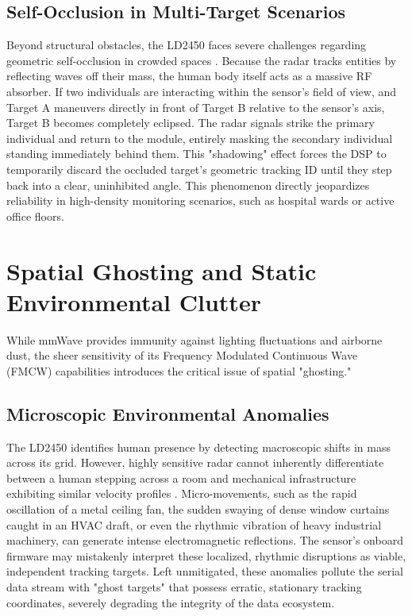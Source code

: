\subsection{Self-Occlusion in Multi-Target Scenarios}
Beyond structural obstacles, the LD2450 faces severe challenges regarding geometric self-occlusion in crowded spaces \cite{wang2018track}. Because the radar tracks entities by reflecting waves off their mass, the human body itself acts as a massive RF absorber. If two individuals are interacting within the sensor's field of view, and Target A maneuvers directly in front of Target B relative to the sensor’s axis, Target B becomes completely eclipsed. The radar signals strike the primary individual and return to the module, entirely masking the secondary individual standing immediately behind them. This "shadowing" effect forces the DSP to temporarily discard the occluded target's geometric tracking ID until they step back into a clear, uninhibited angle. This phenomenon directly jeopardizes reliability in high-density monitoring scenarios, such as hospital wards or active office floors.

\section{Spatial Ghosting and Static Environmental Clutter}
While mmWave provides immunity against lighting fluctuations and airborne dust, the sheer sensitivity of its Frequency Modulated Continuous Wave (FMCW) capabilities introduces the critical issue of spatial "ghosting."

\subsection{Microscopic Environmental Anomalies}
The LD2450 identifies human presence by detecting macroscopic shifts in mass across its grid. However, highly sensitive radar cannot inherently differentiate between a human stepping across a room and mechanical infrastructure exhibiting similar velocity profiles \cite{zheng2019indoor}. Micro-movements, such as the rapid oscillation of a metal ceiling fan, the sudden swaying of dense window curtains caught in an HVAC draft, or even the rhythmic vibration of heavy industrial machinery, can generate intense electromagnetic reflections. The sensor's onboard firmware may mistakenly interpret these localized, rhythmic disruptions as viable, independent tracking targets. Left unmitigated, these anomalies pollute the serial data stream with "ghost targets" that possess erratic, stationary tracking coordinates, severely degrading the integrity of the data ecosystem.

